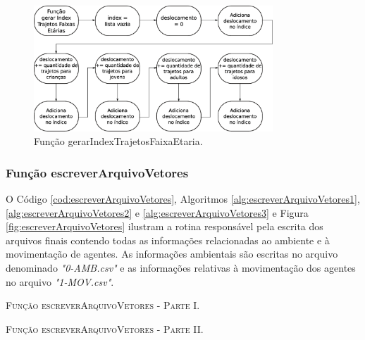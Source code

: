 \begin{figure}[H]
  \centering
  \includegraphics[width=0.8\textwidth]{Figuras/Simula/Fluxos/gerarIndexTrajetosFaixaEtaria.eps}
  \caption{Função gerarIndexTrajetosFaixaEtaria.}
  \label{fig:gerarIndexTrajetosFaixaEtaria}
\end{figure} 

\newpage

\subsubsection{Função escreverArquivoVetores}

O Código \ref{cod:escreverArquivoVetores}, Algoritmos \ref{alg:escreverArquivoVetores1}, \ref{alg:escreverArquivoVetores2} e \ref{alg:escreverArquivoVetores3} e Figura \ref{fig:escreverArquivoVetores} ilustram a rotina responsável pela escrita dos arquivos finais contendo todas as informações relacionadas ao ambiente e à movimentação de agentes. As informações ambientais são escritas no arquivo denominado \textit{"0-AMB.csv"} e as informações relativas à movimentação dos agentes no arquivo \textit{"1-MOV.csv"}.



\newpage

\begin{algorithm}[H]
   \SetAlgoLined   
   
   \caption{\textsc{Função escreverArquivoVetores - Parte I.}}
   \label{alg:escreverArquivoVetores1}
\end{algorithm}

\newpage

\begin{algorithm}[H]
   \SetAlgoLined   
   
   \caption{\textsc{Função escreverArquivoVetores - Parte II.}}
   \label{alg:escreverArquivoVetores2}
\end{algorithm}

